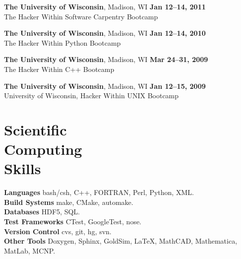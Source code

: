 \documentclass[margin,line]{resume}
\begin{document}
\begin{resume}
    \textbf{The University of Wisconsin}, Madison, WI \hfill\textbf{Jan 12--14, 2011}\\
    The Hacker Within Software Carpentry Bootcamp

    \textbf{The University of Wisconsin}, Madison, WI \hfill \textbf{Jan 12--14, 2010}\\
    The Hacker Within Python Bootcamp

    \textbf{The University of Wisconsin}, Madison, WI \hfill \textbf{Mar 24--31, 2009}\\
    The Hacker Within C++ Bootcamp

    \textbf{The University of Wisconsin}, Madison, WI \hfill \textbf{Jan 12--15, 2009}\\
    University of Wisconsin, Hacker Within UNIX Bootcamp

    \vspace{5mm}
    \section{\mysidestyle Scientific\\Computing\\Skills}
                \textbf{Languages} \hfill bash/csh, C++, FORTRAN, Perl, Python, XML.\vspace{.5mm}\\%
                \textbf{Build Systems} \hfill make, CMake, automake.\vspace{.5mm}\\%
                \textbf{Databases} \hfill HDF5, SQL.\vspace{.5mm}\\%
                \textbf{Test Frameworks} \hfill CTest, GoogleTest, nose.\vspace{.5mm}\\%
                \textbf{Version Control} \hfill cvs, git, hg, svn.\vspace{.5mm}\\%
                \textbf{Other Tools} \hfill Doxygen, Sphinx, GoldSim, \LaTeX, MathCAD, Mathematica, MatLab, MCNP.\vspace{.5mm}\\%


\end{resume}
\end{document}
